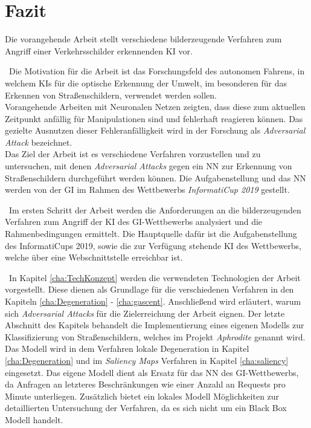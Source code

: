 \chapter{Fazit}
\label{cha:Fazit} \label{cha:Schluss}
Die vorangehende Arbeit stellt verschiedene bilderzeugende Verfahren zum Angriff einer Verkehrsschilder erkennenden \ac{KI} vor.

~\newline Die Motivation für die Arbeit ist das Forschungsfeld des autonomen Fahrens, in welchem \acp{KI} für die optische Erkennung der Umwelt, im besonderen für das Erkennen von Straßenschildern, verwendet werden sollen.\\
Vorangehende Arbeiten mit Neuronalen Netzen zeigten, dass diese zum aktuellen Zeitpunkt anfällig für Manipulationen sind und fehlerhaft reagieren können. Das gezielte Ausnutzen dieser Fehleranfälligkeit wird in der Forschung als \textit{Adversarial Attack} bezeichnet.\\
Das Ziel der Arbeit ist es verschiedene Verfahren vorzustellen und zu untersuchen, mit denen \textit{Adversarial Attacks} gegen ein \ac{NN} zur Erkennung von Straßenschildern durchgeführt werden können. Die Aufgabenstellung und das \ac{NN} werden von der \acl{GI} im Rahmen des Wettbewerbs \textit{InformatiCup 2019} gestellt.

~\newline Im ersten Schritt der Arbeit werden die Anforderungen an die bilderzeugenden Verfahren zum Angriff der \ac{KI} des \ac{GI}-Wettbewerbs analysiert und die Rahmenbedingungen ermittelt. Die Hauptquelle dafür ist die Aufgabenstellung des InformatiCups 2019, sowie die zur Verfügung stehende \ac{KI} des Wettbewerbs, welche über eine Webschnittstelle erreichbar ist.

~\newline In Kapitel \ref{cha:TechKonzept} werden die verwendeten Technologien der Arbeit vorgestellt. Diese dienen als Grundlage für die verschiedenen Verfahren in den Kapiteln \ref{cha:Degeneration} - \ref{cha:gascent}. Anschließend wird erläutert, warum sich \textit{Adversarial Attacks} für die Zielerreichung der Arbeit eignen. Der letzte Abschnitt des Kapitels behandelt die Implementierung eines eigenen Modells zur Klassifizierung von Straßenschildern, welches im Projekt \textit{Aphrodite} genannt wird. Das Modell wird in dem Verfahren lokale Degeneration in Kapitel \ref{cha:Degeneration} und im \textit{Saliency Maps} Verfahren in Kapitel \ref{cha:saliency} eingesetzt. Das eigene Modell dient als Ersatz für das \ac{NN} des \ac{GI}-Wettbewerbs, da Anfragen an letzteres Beschränkungen wie einer Anzahl an Requests pro Minute unterliegen. Zusätzlich bietet ein lokales Modell Möglichkeiten zur detaillierten Untersuchung der Verfahren, da es sich nicht um ein Black Box Modell handelt.
 
